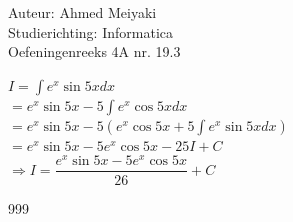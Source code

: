 \documentclass[a4paper]{article}
\begin{document}
  
\noindent \large Auteur: Ahmed Meiyaki \\
\noindent \large Studierichting: Informatica\\
\noindent \large Oefeningenreeks 4A nr. 19.3\\

\medskip

\normalsize

$I = \displaystyle\int e^x \sin5x dx $\\

$=e^x \sin5x - 5\displaystyle\int e^x \cos5x dx  $\\

$=e^x \sin5x - 5 \left(e^x \cos5x + 5\displaystyle\int e^x \sin5x dx\right)  $\\

$=e^x \sin5x - 5e^x \cos5x -25I + C $\\

$\Rightarrow I = \dfrac{e^x \sin5x - 5e^x \cos 5x}{26} + C $\\





\begin{thebibliography}{999}
\end{thebibliography}
\end{document}

